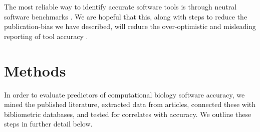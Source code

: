 \documentclass{bmcart}
\begin{document}
The most reliable way to identify accurate software tools is through neutral
software benchmarks \cite{Boulesteix2013-vb}. We are hopeful that
this, along with steps to reduce the publication-bias we have
described, will reduce the over-optimistic and misleading reporting of
tool accuracy \cite{Boulesteix2010-te,Jelizarow2010-zf,Norel2011-cq}.


\section*{Methods}
In order to evaluate predictors of computational biology software
accuracy, we mined the published literature, extracted data from
articles, connected these with bibliometric databases, and tested for
correlates with accuracy. We outline these steps in further detail
below.
\end{document}
